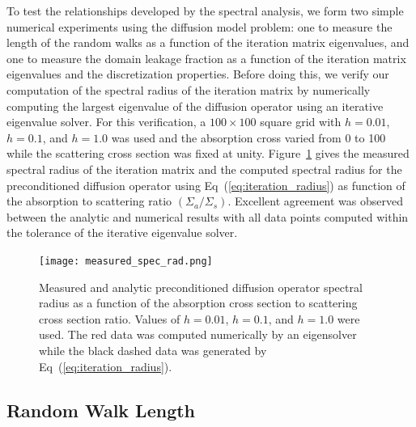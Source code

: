 \documentclass[preprint,11pt]{elsarticle}
\begin{document}
To test the relationships developed by the spectral analysis, we form two
simple numerical experiments using the diffusion model problem: one to measure
the length of the random walks as a function of the iteration matrix
eigenvalues, and one to measure the domain leakage fraction as a function of
the iteration matrix eigenvalues and the discretization properties. Before
doing this, we verify our computation of the spectral radius of the iteration
matrix by numerically computing the largest eigenvalue of the diffusion
operator using an iterative eigenvalue solver. For this verification, a $100
\times 100$ square grid with $h=0.01$, $h=0.1$, and $h=1.0$ was used and the
absorption cross varied from 0 to 100 while the scattering cross section was
fixed at unity. Figure~\ref{fig:measured_spec_rad} gives the measured spectral
radius of the iteration matrix and the computed spectral radius for the
preconditioned diffusion operator using Eq~(\ref{eq:iteration_radius}) as
function of the absorption to scattering ratio $(\Sigma_a /
\Sigma_s)$. Excellent agreement was observed between the analytic and
numerical results with all data points computed within the tolerance of the
iterative eigenvalue solver.
\begin{figure}[ht!]
  \begin{center}
    \texttt{[image: measured\_spec\_rad.png]}
  \end{center}
  \caption{Measured and analytic preconditioned diffusion operator
    spectral radius as a function of the absorption cross section to
    scattering cross section ratio. Values of $h=0.01$, $h=0.1$, and
    $h=1.0$ were used. The red data was computed numerically by an
    eigensolver while the black dashed data was generated by
    Eq~(\ref{eq:iteration_radius}).}
  \label{fig:measured_spec_rad}
\end{figure}

\subsection{Random Walk Length}
\label{subsec:walk_length}
\end{document}

